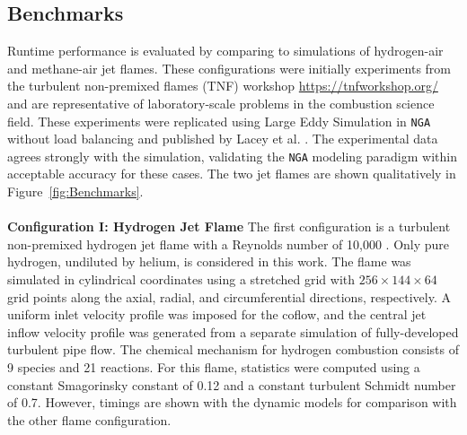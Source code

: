 \documentclass[letterpaper,twocolumn,10pt]{article}
\begin{document}
\subsection{Benchmarks}
Runtime performance is evaluated by comparing to simulations of hydrogen-air and methane-air jet flames. These configurations were initially experiments from the turbulent non-premixed flames (TNF) workshop \url{https://tnfworkshop.org/} and are representative of laboratory-scale problems in the combustion science field.  These experiments were replicated using Large Eddy Simulation in \texttt{NGA} without load balancing and published by Lacey et al. \cite{LACEY2021,Lacey_thesis}. The experimental data agrees strongly with the simulation, validating the \texttt{NGA} modeling paradigm within acceptable accuracy for these cases. The two jet flames are shown qualitatively in Figure~\ref{fig:Benchmarks}.
\\ \\  \noindent
\textbf{Configuration I: Hydrogen Jet Flame}
The first configuration is a turbulent non-premixed hydrogen jet flame with a Reynolds number of 10,000 \cite{TNF,BARLOW1994,BARLOW1996}. Only pure hydrogen, undiluted by helium, is considered in this work. The flame was simulated in cylindrical coordinates using a stretched grid with $256 \times 144 \times 64$ grid points along the axial, radial, and circumferential directions, respectively. A uniform inlet velocity profile was imposed for the coflow, and the central jet inflow velocity profile was generated from a separate simulation of fully-developed turbulent pipe flow. The chemical mechanism for hydrogen combustion \cite{Li2004} consists of 9 species and 21 reactions. For this flame, statistics were computed using a constant Smagorinsky constant of 0.12 and a constant turbulent Schmidt number of 0.7. However, timings are shown with the dynamic models for comparison with the other flame configuration.
\end{document}
